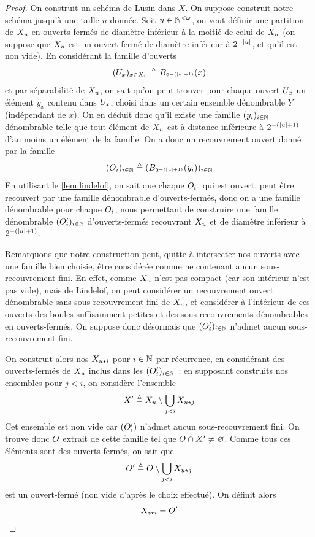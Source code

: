 \begin{proof}
  On construit un schéma de Lusin dans $X$. On suppose construit notre schéma
  jusqu'à une taille $n$ donnée. Soit $\varwd \in \bN^{<\omega}$, on veut
  définir une partition de $X_\varwd$ en ouverts-fermés de diamètre inférieur à
  la moitié de celui de $X_\varwd$ (on suppose que $X_\varwd$ est un ouvert-fermé
  de diamètre inférieur à $2^{-|\varwd|}$, et qu'il est non vide). En considérant
  la famille d'ouverts
  \[(\varOp_x)_{x \in X_\varwd} \defeq \boule{x}{2^{-(|\varwd|+1)}}\]
  et par séparabilité de $X_\varwd$, on sait qu'on peut trouver pour chaque
  ouvert $\varOp_x$ un élément $y_x$ contenu dans $\varOp_x$, choisi dans un
  certain ensemble dénombrable $Y$ (indépendant de $x$). On en déduit donc qu'il
  existe une famille $(y_i)_{i\in \bN}$ dénombrable telle que tout élément de
  $X_\varwd$ est à distance inférieure à $2^{-(|\varwd| + 1)}$ d'au moins un élément
  de la famille. On a donc un recouvrement ouvert donné par la famille
  \[(\varOpB_i)_{i \in \bN} \defeq(\boule{y_i}{2^{-(|\varwd| + 1)}})_{i \in \bN}\]
  En utilisant le \cref{lem.lindelof}, on sait que chaque $\varOpB_i$, qui est
  ouvert, peut être recouvert par une famille dénombrable d'ouverts-fermés, donc
  on a une famille dénombrable pour chaque $\varOpB_i$, nous permettant de
  construire une famille dénombrable $(\varOpB'_i)_{i \in\bN}$ d'ouverts-fermés
  recouvrant $X_\varwd$ et de diamètre inférieur à $2^{-(|\varwd| + 1)}$.

  Remarquons que notre construction peut, quitte à intersecter nos ouverts
  avec une famille bien choisie, être considérée comme ne contenant aucun
  sous-recouvrement fini. En effet, comme $X_\varwd$ n'est pas compact (car son
  intérieur n'est pas vide), mais de Lindelöf, on peut considérer un
  recouvrement ouvert dénombrable sans sous-recouvrement fini de $X_\varwd$, et
  considérer à l'intérieur de ces ouverts des boules suffisamment petites et des
  sous-recouvrements dénombrables en ouverts-fermés. On suppose donc désormais
  que $(\varOpB'_i)_{i \in \bN}$ n'admet aucun sous-recouvrement fini.

  On construit alors nos $X_{\varwd\wdPt i}$ pour $i \in \bN$ par récurrence, en
  considérant des ouverts-fermés de $X_\varwd$ inclus dans les
  $(\varOpB'_i)_{i\in \bN}$~: en supposant construits nos ensembles pour $j < i$,
  on considère l'ensemble
  \[X' \defeq X_\varwd\setminus\bigcup_{j < i} X_{\varwd\wdPt j}\]
  Cet ensemble est non vide car $(\varOpB'_i)$ n'admet aucun sous-recouvrement
  fini. On trouve donc $\varOpB$ extrait de cette famille tel que
  $\varOpB\cap X' \neq \vide$. Comme tous ces éléments sont des ouverts-fermés,
  on sait que
  \[\varOpB' \defeq \varOpB \setminus \bigcup_{j < i} X_{\varwd\wdPt j}\]
  est un ouvert-fermé (non vide d'après le choix effectué). On définit alors
  \[X_{s \wdPt i} = \varOpB'\]


\end{proof}
